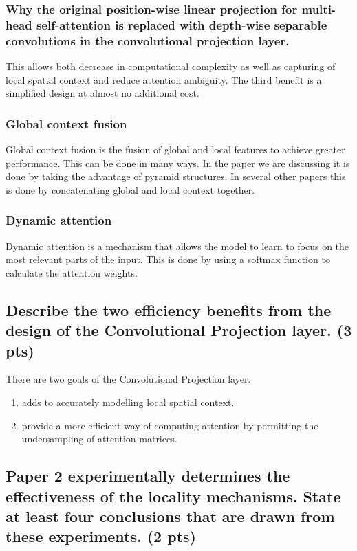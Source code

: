 \documentclass{article}
\begin{document}
\subsubsection{Why the original position-wise linear projection for multi-head self-attention is replaced with depth-wise separable convolutions in the convolutional projection layer.}

This allows both decrease in computational complexity as well as capturing of local spatial context and reduce attention ambiguity. The third benefit is a simplified design at almost no additional cost. 

\subsubsection{Global context fusion}

 Global context fusion is the fusion of global and local features to achieve greater performance. This can be done in many ways. In the paper we are discussing it is done by taking the advantage of pyramid structures. In several other papers this is done by concatenating global and local context together.

\subsubsection{Dynamic attention}

Dynamic attention is a mechanism that allows the model to learn to focus on the most relevant parts of the input. This is done by using a softmax function to calculate the attention weights.

\subsection{Describe the two efficiency benefits from the design of the Convolutional Projection layer. (3 pts)}

There are two goals of the Convolutional Projection layer.

\begin{enumerate}
    \item adds to accurately modelling local spatial context.
    \item provide a more efficient way of computing attention by permitting the undersampling of attention matrices.
\end{enumerate}

\subsection{Paper 2 experimentally determines the effectiveness of the locality mechanisms. State at least four conclusions that are drawn from these experiments. (2 pts)}
\end{document}
